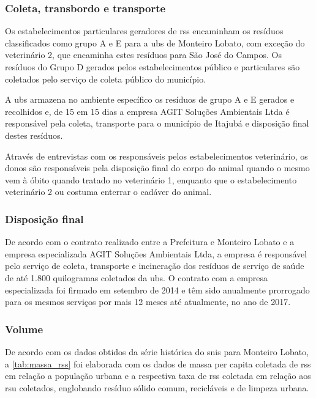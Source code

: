 \subsubsection{Coleta, transbordo e transporte} 
Os estabelecimentos particulares geradores de \gls{rss} encaminham os resíduos classificados como grupo A e E para a \gls{ubs} de Monteiro Lobato, com exceção do veterinário 2, que encaminha estes resíduos para São José do Campos. Os resíduos do Grupo D gerados pelos estabelecimentos público e particulares são coletados pelo serviço de coleta público do município.

A \gls{ubs} armazena no ambiente específico os resíduos de grupo A e E gerados e recolhidos e, de 15 em 15 dias a empresa AGIT Soluções Ambientais Ltda é responsável pela coleta, transporte para o município de Itajubá e disposição final destes resíduos.

Através de entrevistas com os responsáveis pelos estabelecimentos veterinário, os donos são responsáveis pela disposição final do corpo do animal quando o mesmo vem à óbito quando tratado no veterinário 1, enquanto que o estabelecimento veterinário 2 ou costuma enterrar o cadáver do animal.

\subsubsection{Disposição final}

De acordo com o contrato realizado entre a Prefeitura e Monteiro Lobato e a empresa especializada AGIT Soluções Ambientais Ltda, a empresa é responsável pelo serviço de coleta, transporte e incineração dos resíduos de serviço de saúde de até 1.800 quilogramas coletados da \gls{ubs}.
O contrato com a empresa especializada foi firmado em setembro de 2014 e têm sido anualmente prorrogado para os mesmos serviços por mais 12 meses até atualmente, no ano de 2017.

\subsubsection{Volume}
De acordo com os dados obtidos da série histórica do \gls{snis} para Monteiro Lobato, a \autoref{tab:massa_rss} foi elaborada com os dados de massa per capita coletada de \gls{rss} em relação a população urbana e a respectiva taxa de \gls{rss} coletada em relação aos \gls{rsu} coletados, englobando resíduo sólido comum, recicláveis e de limpeza urbana.



